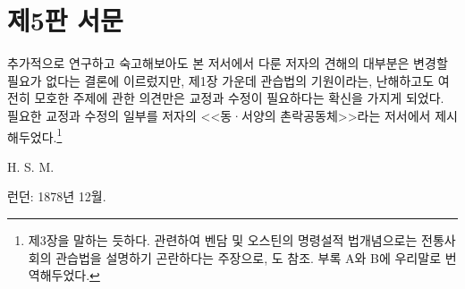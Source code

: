 \chapter*{제5판 서문}

추가적으로 연구하고 숙고해보아도
본 저서에서 다룬 저자의 견해의 대부분은
변경할 필요가 없다는 결론에 이르렀지만,
제1장 가운데
관습법의 기원이라는, 난해하고도 여전히 모호한 주제에 관한 의견만은
교정과 수정이 필요하다는 확신을 가지게 되었다.
필요한 교정과 수정의 일부를
저자의
<<동·서양의 촌락공동체>>라는
저서에서 제시해두었다.\footnote{%
   제3장을 말하는 듯하다.
  관련하여 벤담 및 오스틴의 명령설적 법개념으로는
  전통사회의 관습법을 설명하기 곤란하다는 주장으로,
  도 참조.
  부록 A와 B에 우리말로 번역해두었다. }

\begin{flushright}
H. S. M.
\end{flushright}

\begin{footnotesize}
런던: 1878년 12월.
\end{footnotesize}

